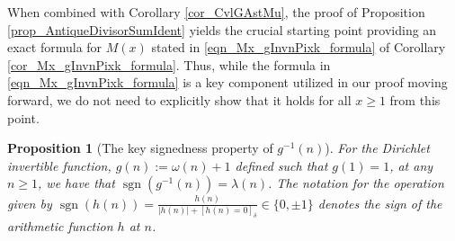 \documentclass[11pt,reqno,a4letter]{article}
\numberwithin{figure}{section}
\numberwithin{table}{section}
\newcommand{\Iverson}[1]{\ensuremath{\left[#1\right]_{\delta}}}
\theoremstyle{plain}
\newtheorem{prop}[theorem]{Proposition}
\numberwithin{theorem}{section}
\theoremstyle{definition}
\newcommand{\NBRef}[1]{}
\begin{document}
When combined with Corollary \ref{cor_CvlGAstMu}, the 
proof of Proposition \ref{prop_AntiqueDivisorSumIdent} yields the crucial 
starting point providing an exact 
formula for $M(x)$ stated in \eqref{eqn_Mx_gInvnPixk_formula} of 
Corollary \ref{cor_Mx_gInvnPixk_formula}. Thus, while the formula in \eqref{eqn_Mx_gInvnPixk_formula} 
is a key component utilized in our proof moving forward, we do not need to explicitly show that it holds 
for all $x \geq 1$ from this point. 

\begin{prop}[The key signedness property of $g^{-1}(n)$]
\label{prop_SignageDirInvsOfPosBddArithmeticFuncs_v1} 
For the Dirichlet invertible function, $g(n) := \omega(n) + 1$ defined such that $g(1) = 1$, at any 
$n \geq 1$, we have that $\operatorname{sgn}(g^{-1}(n)) = \lambda(n)$. 
The notation for the operation given by 
$\operatorname{sgn}(h(n)) = \frac{h(n)}{|h(n)| + \Iverson{h(n) = 0}} \in \{0, \pm 1\}$ denotes the sign 
of the arithmetic function $h$ at $n$. 
\NBRef{A02-2020-04-26}
\end{prop} 
\end{document}
